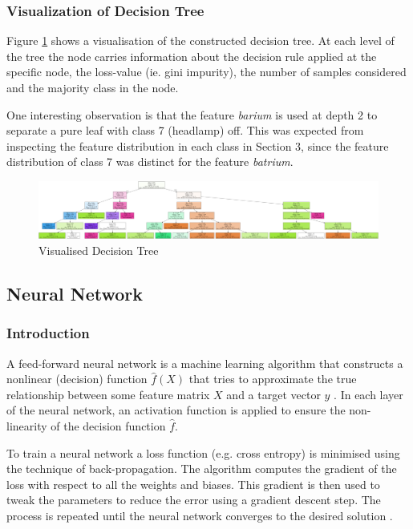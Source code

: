\subsubsection{Visualization of Decision Tree}
Figure \ref{dt_visualisation} shows a visualisation of the constructed decision tree. At each level of the tree the node carries information about the decision rule applied at the specific node, the loss-value (ie. gini impurity), the number of samples considered and the majority class in the node. 

One interesting observation is that the feature \textit{barium} is used at depth 2 to separate a pure leaf with class 7 (headlamp) off. This was expected from inspecting the feature distribution in each class in Section 3, since the feature distribution of class 7 was distinct for the feature \textit{batrium}. 

\begin{figure}[ht]
\centering
\includegraphics[scale=0.09]{figures/graphviz_sklearn_dt.png}
\caption{Visualised Decision Tree}
\label{dt_visualisation}
\end{figure}


\subsection{Neural Network}
\subsubsection{Introduction}
A feed-forward neural network is a machine learning algorithm that constructs
a nonlinear (decision) function $\hat{f}(X)$ that tries to approximate the true relationship between some feature matrix $X$ and a target vector $y$ \cite{introStats}. In each layer of the neural network, an activation function is applied to ensure the non-linearity of the decision function $\hat{f}$.

To train a neural network a loss function (e.g. cross entropy) is minimised using the technique of back-propagation. The algorithm computes the gradient of the loss with respect to all the weights and biases. This gradient
is then used to tweak the parameters to reduce the error using a gradient descent step. The process is repeated until the neural network converges to the desired solution \cite{handsonML}.

